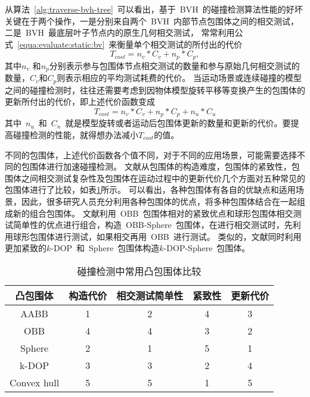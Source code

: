 从算法~\ref{alg:traverse-bvh-tree}~可以看出，基于~BVH~的碰撞检测算法性能的好坏关键在于两个操作，一是分别来自两个~BVH~内部节点包围体之间的相交测试，二是~BVH~最底层叶子节点内的原生几何相交测试，
常常利用公式~\ref{equa:evaluate:static:bv}~来衡量单个相交测试的所付出的代价
\begin{equation}
T_{cost} = n_v * C_v + n_p * C_p,
\label{equa:evaluate:static:bv}
\end{equation}
其中$n_v$
和$n_p$分别表示参与包围体节点相交测试的数量和参与原始几何相交测试的数量，$C_v$和$C_p$则表示相应的平均测试耗费的代价\cite{klosowski1998efficient}。
当运动场景或连续碰撞的模型之间的碰撞检测时，往往还需要考虑到因物体模型旋转平移等变换产生的包围体的更新所付出的代价，即上述代价函数变成
\begin{equation}
T_{cost} = n_v * C_v + n_p * C_p + n_u * C_u
  \label{equa:evaluate:dynamic:bv}
\end{equation}
其中~$n_u$~和~$C_n$~就是模型旋转或者运动后包围体更新的数量和更新的代价。要提高碰撞检测的性能，就得想办法减小$T_{cost}$的值。

不同的包围体，上述代价函数各个值不同，对于不同的应用场景，可能需要选择不同的包围体进行加速碰撞检测。
文献从包围体的构造难度，包围体的紧致性，包围体之间相交测试复杂性及包围体在运动过程中的更新代价几个方面对五种常见的包围体进行了比较，如表\ref{lbl:table:bv-comp}所示。
可以看出，各种包围体有各自的优缺点和适用场景，因此，很多研究人员充分利用各种包围体的优点，将多种包围体结合在一起组成新的组合包围体。
文献\cite{chang2010efficient}利用~OBB~包围体相对的紧致优点和球形包围体相交测试简单性的优点进行组合，构造~OBB-Sphere~包围体，在进行相交测试时，先利用球形包围体进行测试，如果相交再用~OBB~进行测试。
类似的，文献\cite{zhigang2010efficient}同时利用更加紧致的$k$-DOP~和~Sphere~包围体构造$k$-DOP-Sphere~包围体。

\begin{table}[htbp]
\centering
\caption{碰撞检测中常用凸包围体比较}
\begin{tabular}{ccccc}
\toprule[1.5pt]
凸包围体 & 构造代价 & 相交测试简单性 & 紧致性 & 更新代价\\
\midrule[1.0pt]
AABB   & 1 & 2 & 4 & 3\\
OBB    & 4 & 4 & 3 & 2\\
Sphere & 2 & 1 & 5 & 1\\
k-DOP  & 3 & 3 & 2 & 4\\
Convex hull & 5 & 5 & 1 & 5 \\
\bottomrule[1.5pt]
\end{tabular}
\label{lbl:table:bv-comp}
\end{table}


